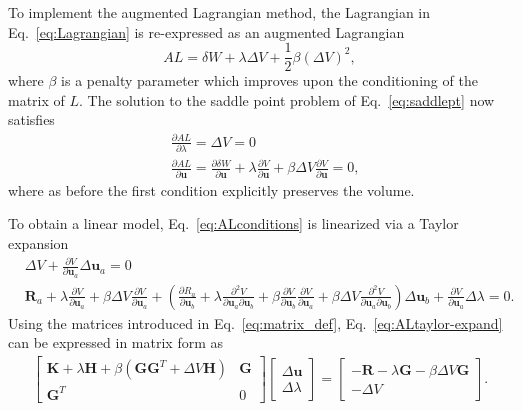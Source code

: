 To implement the augmented Lagrangian method, the Lagrangian in Eq.\ \eqref{eq:Lagrangian} is re-expressed as an augmented Lagrangian
%
\begin{equation}
AL = \delta W + \lambda \Delta V + \frac{1}{2}\beta(\Delta V)^2,
\label{eq:AugmentedLagrangian}
\end{equation}
%
where $\beta$ is a penalty parameter which improves upon the conditioning of the matrix of $L$. The solution to the saddle point problem of Eq.\ \eqref{eq:saddlept} now satisfies
%
\begin{equation}
\begin{aligned}
&\frac{\partial AL}{\partial \lambda} = \Delta V = 0 \\
&\frac{\partial AL}{\partial \pmb{u}} = \frac{\partial \delta W}{\partial \pmb{u}} + \lambda \frac{\partial V}{\partial \pmb{u}} + \beta \Delta V \frac{\partial V}{\partial \pmb{u}} = 0,
\end{aligned}
\label{eq:ALconditions}
\end{equation}
%
where as before the first condition explicitly preserves the volume.

To obtain a linear model, Eq.\ \eqref{eq:ALconditions} is linearized via a Taylor expansion
%
\begin{equation}
\begin{aligned}
&\Delta V + \frac{\partial V}{\partial  \pmb{u}_a} \Delta \pmb{u}_a = 0 \\
%
&\pmb{R}_a + \lambda \frac{\partial V}{\partial \pmb{u}_a} + \beta \Delta V \frac{\partial V}{\partial \pmb{u}_a}
%
+ \left(\frac{\partial R_a}{\partial \pmb{u}_b} + \lambda \frac{\partial^2 V}{\partial \pmb{u}_a \partial \pmb{u}_b} + \beta \frac{\partial V}{\partial \pmb{u}_b} \frac{\partial V}{\partial \pmb{u}_a} + \beta \Delta V \frac{\partial^2 V}{\partial \pmb{u}_a \partial \pmb{u}_b} \right) \Delta \pmb{u}_b 
%
+ \frac{\partial V}{\partial \pmb{u}_a} \Delta \lambda =0.
\end{aligned}
\label{eq:ALtaylor-expand}
\end{equation}
%
Using the matrices introduced in Eq.\ \eqref{eq:matrix_def}, Eq.\ \eqref{eq:ALtaylor-expand} can be expressed in matrix form as
%
\begin{eqnarray}
\begin{bmatrix}
\textbf{K} + \lambda \textbf{H} + \beta \left(\textbf{G} \textbf{G}^T + \Delta V \textbf{H} \right)& \textbf{G} \\
\textbf{G}^T & 0 
\end{bmatrix}
%
\begin{bmatrix}
\Delta \textbf{u} \\ \Delta \lambda
\end{bmatrix}
%
= \begin{bmatrix}
-\textbf{R}-\lambda \textbf{G} - \beta \Delta V \textbf{G} \\
- \Delta V 
\end{bmatrix}.
\label{eq:ALtaylor-expand_matrix}
\end{eqnarray}
%

